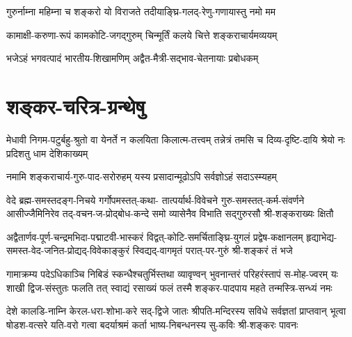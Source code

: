 \twolineshloka
{गुरुर्नाम्ना महिम्ना च शङ्करो यो विराजते}
{तदीयाङ्घ्रि-गलद्-रेणु-गणायास्तु नमो मम}


\twolineshloka
{कामाक्षी-करुणा-रूपं कामकोटि-जगद्गुरुम्}
{चिन्मूर्तिं कलये चित्ते शङ्कराचार्यमव्ययम्}


\twolineshloka
{भजेऽहं भगवत्पादं भारतीय-शिखामणिम्}
{अद्वैत-मैत्री-सद्भाव-चेतनायाः प्रबोधकम्}



\section{शङ्कर-चरित्र-ग्रन्थेषु}

\twolineshloka
{मेधावी निगम-पटुर्बहु-श्रुतो वा येनर्ते न कलयिता किलात्म-तत्त्वम्}
{तन्नेत्रं तमसि च दिव्य-दृष्टि-दायि श्रेयो नः प्रदिशतु धाम देशिकाख्यम्}


\twolineshloka
{नमामि शङ्कराचार्य-गुरु-पाद-सरोरुहम्}
{यस्य प्रसादान्मूढोऽपि सर्वज्ञोऽहं सदाऽस्म्यहम्}

\fourlineindentedshloka
{वेदे ब्रह्म-समस्तदङ्ग-निचये गर्गोपमस्तत्-कथा-}
{तात्पर्यार्थ-विवेचने गुरु-समस्तत्-कर्म-संवर्णने}
{आसीज्जैमिनिरेव तद्-वचन-ज-प्रोद्बोध-कन्दे समो}
{व्यासेनैव विभाति सद्गुरुरसौ श्री-शङ्कराख्यः क्षितौ}

\fourlineindentedshloka
{अद्वैतार्णव-पूर्ण-चन्द्रमभिदा-पद्माटवी-भास्करं}
{विद्वत्-कोटि-समर्चिताङ्घ्रि-युगलं प्रद्वेष-कक्षानलम्}
{हृद्याभेद्य-समस्त-वेद-जनित-प्रोद्यद्-विवेकाङ्कुरं}
{स्विद्यद्-वागमृतं परात्-पर-गुरुं श्री-शङ्करं तं भजे}


\fourlineindentedshloka
{गामाक्रम्य पदेऽधिकाञ्चि निबिडं स्कन्धैश्चतुर्भिस्तथा}
{व्यावृण्वन् भुवनान्तरं परिहरंस्तापं स-मोह-ज्वरम्}
{यः शाखी द्विज-संस्तुतः फलति तत् स्वाद्यं रसाख्यं फलं}
{तस्मै शङ्कर-पादपाय महते तन्मस्त्रि-सन्ध्यं नमः}


\fourlineindentedshloka
{देशे कालडि-नाम्नि केरल-धरा-शोभा-करे सद्-द्विजे}
{जातः श्रीपति-मन्दिरस्य सविधे सर्वज्ञतां प्राप्तवान्}
{भूत्वा षोडश-वत्सरे यति-वरो गत्वा बदर्याश्रमं}
{कर्ता भाष्य-निबन्धनस्य सु-कविः श्री-शङ्करः पावनः}

